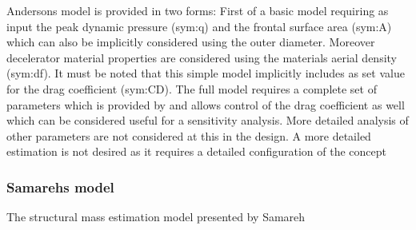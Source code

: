 Andersons model is provided in two forms: First of a basic model requiring as input the peak dynamic pressure (\gls{sym:q}) and the frontal surface area (\gls{sym:A}) which can also be implicitly considered using the outer diameter. Moreover decelerator material properties are considered using the materials aerial density (\gls{sym:df}). It must be noted that this simple model implicitly includes as set value for the drag coefficient (\gls{sym:CD}). The full model requires a complete set of parameters which is provided by \cite{Anderson1969} and allows control of the drag coefficient as well which can be considered useful for a sensitivity analysis. More detailed analysis of other parameters are not considered at this in the design. A more detailed estimation is not desired as it requires a detailed configuration of the concept

\subsubsection{Samarehs model}

The structural mass estimation model presented by Samareh 